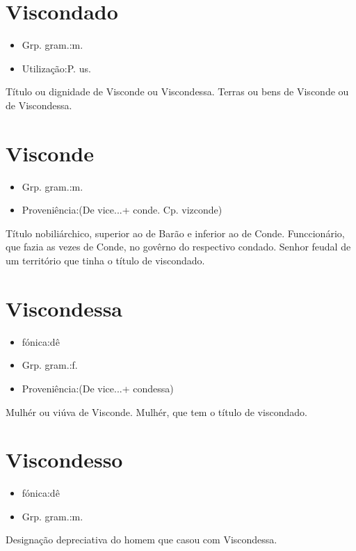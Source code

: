 \documentclass{article}
\begin{document}
\section{Viscondado}
\begin{itemize}
\item {Grp. gram.:m.}
\end{itemize}
\begin{itemize}
\item {Utilização:P. us.}
\end{itemize}
Título ou dignidade de Visconde ou Viscondessa.
Terras ou bens de Visconde ou de Viscondessa.
\section{Visconde}
\begin{itemize}
\item {Grp. gram.:m.}
\end{itemize}
\begin{itemize}
\item {Proveniência:(De \textunderscore vice...\textunderscore  + \textunderscore conde\textunderscore . Cp. \textunderscore vizconde\textunderscore )}
\end{itemize}
Título nobiliárchico, superior ao de Barão e inferior ao de Conde.
Funccionário, que fazia as vezes de Conde, no govêrno do respectivo condado.
Senhor feudal de um território que tinha o título de viscondado.
\section{Viscondessa}
\begin{itemize}
\item {fónica:dê}
\end{itemize}
\begin{itemize}
\item {Grp. gram.:f.}
\end{itemize}
\begin{itemize}
\item {Proveniência:(De \textunderscore vice...\textunderscore  + \textunderscore condessa\textunderscore )}
\end{itemize}
Mulhér ou viúva de Visconde.
Mulhér, que tem o título de viscondado.
\section{Viscondesso}
\begin{itemize}
\item {fónica:dê}
\end{itemize}
\begin{itemize}
\item {Grp. gram.:m.}
\end{itemize}
Designação depreciativa do homem que casou com Viscondessa.
\end{document}
